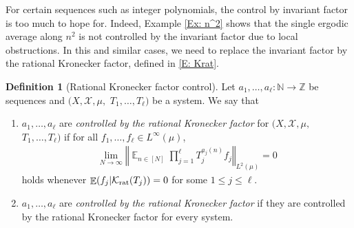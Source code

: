 \documentclass[11pt]{amsart}
\theoremstyle{definition}
\newtheorem{definition}[lemma]{Definition}
\DeclareMathOperator*{\E}{\mathbb{E}}
\newcommand{\N}{{\mathbb N}}
\newcommand{\R}{{\mathbb R}}
\newcommand{\Z}{{\mathbb Z}}
\newcommand{\CK}{{\mathcal K}}
\newcommand{\CX}{{\mathcal X}}
\newcommand{\norm}[1]{\left\Vert #1\right\Vert}
\newcommand{\1}{{\mathbf{1}}}
\newcommand{\Krat}{{\CK_{\text{\rm rat}}}}
\newcommand{\floor}[1]{{\left \lfloor #1 \right \rfloor}}
\begin{document}
For certain sequences such as integer polynomials, the control by invariant factor is too much to hope for. Indeed, Example \ref{Ex: n^2} shows that the single ergodic average along $n^2$ is not controlled by the invariant factor due to local obstructions. In this and similar cases, we need to replace the invariant factor by the rational Kronecker factor, defined in \eqref{E: Krat}.
\begin{definition}[Rational Kronecker factor control]\label{D: Krat control}
    Let $a_1, \ldots, a_\ell:\N\to\Z$ be sequences and $(X, \CX, \mu,$\! $T_1, \ldots, T_\ell)$ be a system. We say that 
 \begin{enumerate}
 \item  $a_1, \ldots, a_\ell$ are \emph{controlled by the rational Kronecker factor} for $(X, \CX, \mu,$\! $T_1, \ldots, T_\ell)$ if for all $f_1, \ldots, f_\ell\in L^\infty(\mu)$,
\begin{align*}%
        \lim_{N\to\infty}\norm{\E_{n\in[N]}\prod_{j=1}^\ell T_j^{{a_{j}(n)}}f_j}_{L^2(\mu)} = 0
    \end{align*}
    holds whenever $\E(f_j|\Krat(T_j)) = 0$ for some $1\leq j\leq \ell$.
     \item  $a_1, \ldots, a_\ell$ are \emph{controlled by the rational Kronecker factor} if they are controlled by the rational Kronecker factor for every system.
    \end{enumerate}
\end{definition}
\end{document}
